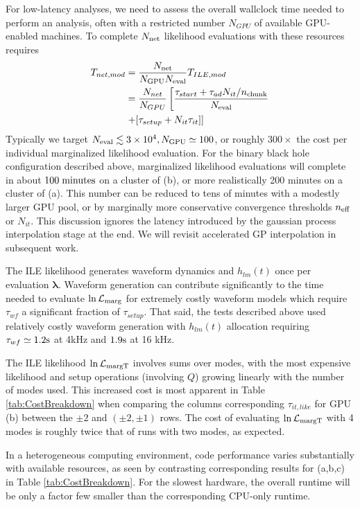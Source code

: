 \documentclass[twocolumn,prd,nofootinbib]{revtex4}
\newcommand\unit[1]{{\rm #1}}
\newcommand\ILE{ILE}
\begin{document}
For low-latency analyses, we need to assess the overall wallclock time needed to perform an analysis, often with a
restricted number $N_{GPU}$ of available GPU-enabled machines.   To  complete $N_{\rm net}$ likelihood evaluations
with these resources requires
\begin{align}
T_{net,mod} &= \frac{N_{\rm net}}{N_{\rm GPU} N_{\rm eval}} T_{ILE,mod} \nonumber \\
& =
  \frac{N_{net}}{N_{GPU}}\left[
\frac{\tau_{start} + \tau_{ad}N_{it}/n_{\rm chunk}}{N_{\rm eval}} 
 \right. \nonumber \\
& \left. + 
 [ \tau_{setup}  + N_{it}\tau_{it}
 ] 
 \right]
\end{align}
Typically we target $N_{\rm eval}  \lesssim 3\times 10^4, N_{\rm GPU} \simeq 100$, or roughly $300\times$ the cost per
individual marginalized likelihood evaluation.  For the binary black hole configuration described above, marginalized
likelihood evaluations will complete in about $100\; \unit{minutes}$ on a cluster of (b), or more realistically 200
minutes on a cluster of (a).  This number can be reduced to
tens of minutes with a modestly larger GPU pool, or by  marginally more conservative convergence thresholds
 $n_{\rm   eff}$ or $N_{it}$.  
This discussion ignores the latency introduced by the  gaussian process interpolation stage at the end.  We will revisit
accelerated GP interpolation in subsequent work.


The \ILE{} likelihood  generates waveform dynamics and $h_{lm}(t)$ once per evaluation $\bm{\lambda}$.   Waveform generation can contribute significantly to the
time needed to evaluate  $\ln {\cal L}_{\rm marg}$ for extremely costly
waveform models which require $\tau_{wf} $ a significant fraction of $  \tau_{setup}$.   That said, the tests described
above used relatively costly waveform generation with $h_{lm}(t)$ allocation requiring $\tau_{wf} \simeq 1.2 \unit{s}$
at 4kHz and $1.9\unit{s}$ at 16 kHz.

The \ILE{} likelihood $\ln {\cal L}_{\rm margT}$ involves sums over modes, with the most expensive likelihood and setup operations (involving $Q$) growing linearly with
the number of modes used.  This increased cost is most apparent in Table \ref{tab:CostBreakdown} when comparing the
columns corresponding  $\tau_{it,like}$ for GPU (b) between the $\pm 2$ and $(\pm 2,\pm 1)$ rows.  The cost of
evaluating $\ln {\cal L}_{\rm margT}$   with 4 modes is roughly twice that of runs with two modes, as expected. 

In a heterogeneous computing environment, code performance varies substantially with available resources, as seen by
contrasting corresponding results for (a,b,c) in Table \ref{tab:CostBreakdown}.      For
the slowest hardware,  the overall runtime will be only a factor few smaller than the corresponding CPU-only runtime.
\end{document}
